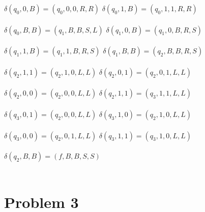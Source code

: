 \documentclass{article}%
\begin{document}
$\delta(q_0, 0, B) = (q_0, 0, 0, R, R)$
\hfill
$\delta(q_0, 1, B) = (q_0, 1, 1, R, R)$\\
\\
$\delta(q_0, B, B) = (q_1, B, B, S, L)$
\hfill
$\delta(q_1, 0, B) = (q_1, 0, B, R, S)$\\
\\
$\delta(q_1, 1, B) = (q_1, 1, B, R, S)$
\hfill
$\delta(q_1, B, B) = (q_2, B, B, R, S)$\\
\\
$\delta(q_2, 1, 1) = (q_2, 1, 0, L, L)$
\hfill
$\delta(q_2, 0, 1) = (q_2, 0, 1, L, L)$\\
\\
$\delta(q_2, 0, 0) = (q_2, 0, 0, L, L)$
\hfill
$\delta(q_2, 1, 1) = (q_3, 1, 1, L, L)$\\
\\
$\delta(q_3, 0, 1) = (q_2, 0, 0, L, L)$
\hfill
$\delta(q_3, 1, 0) = (q_2, 1, 0, L, L)$\\
\\
$\delta(q_3, 0, 0) = (q_2, 0, 1, L, L)$
\hfill
$\delta(q_3, 1, 1) = (q_3, 1, 0, L, L)$\\
\\
$\delta(q_2, B, B) = (f, B, B, S, S)$\\
\\

\section*{Problem 3}
\end{document}

